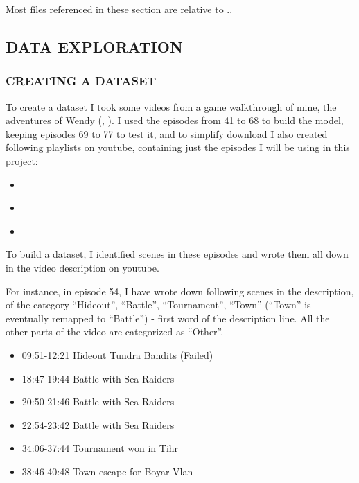 \documentclass[
]{article}
\providecommand{\tightlist}{%
  \setlength{\itemsep}{0pt}\setlength{\parskip}{0pt}}
\newcommand{\hhref}[3][blue]{\href{#2}{\color{#1}{#3}}}%
\begin{document}
Most files referenced in these section are relative to \hhref{https://github.com/diegoami/DA_ML_Capstone/}{this Github repository}..


\hypertarget{data-exploration}{%
\subsection{DATA EXPLORATION}\label{data-exploration}}

\hypertarget{creating-a-dataset}{%
\subsubsection{CREATING A DATASET}\label{creating-a-dataset}}

To create a dataset I took some videos from a game walkthrough of mine,
the adventures of Wendy (\hhref{https://www.youtube.com/playlist?list=PLNP_nRm4k4jfNLo7FkjXewFH9Xe5Uc2Pa}{I}, \hhref{https://www.youtube.com/playlist?list=PLNP_nRm4k4jd-AJ0GwTPS1ld2YP8FdT4h}{II}). 
I used the episodes from 41 to 68 to build the model, keeping episodes 69 to 77 to test it, and to simplify download I also created following playlists on youtube, containing just the episodes I will be using in this project:

\begin{itemize}
\tightlist
\item
  \hhref{https://www.youtube.com/playlist?list=PLNP_nRm4k4jfVfQobYTRQAXV\_uOzt8Bov}{CNN-Wendy-I}
\item
  \hhref{https://www.youtube.com/playlist?list=PLNP_nRm4k4jdEQ-OM31xNqeE64svvx-aT}{CNN-Wendy-II}
\item
  \hhref{https://www.youtube.com/playlist?list=PLNP_nRm4k4jeoJ8H7mtTUbbOJ6_Rx_god}{CNN-Wendy-III}
\end{itemize}

To build a dataset, I identified scenes in these episodes and wrote them all down in the video description on youtube. 

For instance, in episode 54, I have wrote down following scenes in the description, of the
category ``Hideout'', ``Battle'', ``Tournament'', ``Town'' (``Town'' is
eventually remapped to ``Battle'') - first word of the description line. All the other parts of the video are
categorized as ``Other''.   

\begin{itemize}
\tightlist
\item
  09:51-12:21 Hideout Tundra Bandits (Failed)
\item
  18:47-19:44 Battle with Sea Raiders
\item
  20:50-21:46 Battle with Sea Raiders
\item
  22:54-23:42 Battle with Sea Raiders
\item
  34:06-37:44 Tournament won in Tihr
\item
  38:46-40:48 Town escape for Boyar Vlan
\end{itemize}
\end{document}
